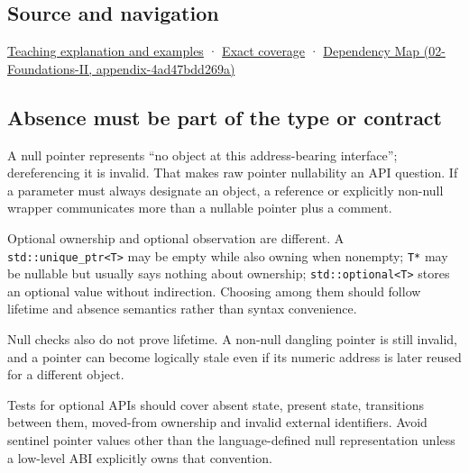 \subsection{Source and navigation}\label{source-and-navigation}

\href{Continuous\%20Notes/Computing\%20Foundations\%20-\%20From\%20Bits\%20to\%20C++\%20and\%20Systems\%20APIs\#A\%20pointer\%20carries\%20an\%20access\%20contract}{Teaching explanation and examples} · \hyperref[appendix-fd090d982a15]{Exact coverage} · \href{}{Dependency Map (02-Foundations-II, appendix-4ad47bdd269a)}

\subsection{Absence must be part of the type or contract}\label{absence-must-be-part-of-the-type-or-contract}

A null pointer represents ``no object at this address-bearing interface''; dereferencing it is invalid. That makes raw pointer nullability an API question. If a parameter must always designate an object, a reference or explicitly non-null wrapper communicates more than a nullable pointer plus a comment.

Optional ownership and optional observation are different. A \texttt{std::unique\_ptr\textless{}T\textgreater{}} may be empty while also owning when nonempty; \texttt{T*} may be nullable but usually says nothing about ownership; \texttt{std::optional\textless{}T\textgreater{}} stores an optional value without indirection. Choosing among them should follow lifetime and absence semantics rather than syntax convenience.

Null checks also do not prove lifetime. A non-null dangling pointer is still invalid, and a pointer can become logically stale even if its numeric address is later reused for a different object.

Tests for optional APIs should cover absent state, present state, transitions between them, moved-from ownership and invalid external identifiers. Avoid sentinel pointer values other than the language-defined null representation unless a low-level ABI explicitly owns that convention.
